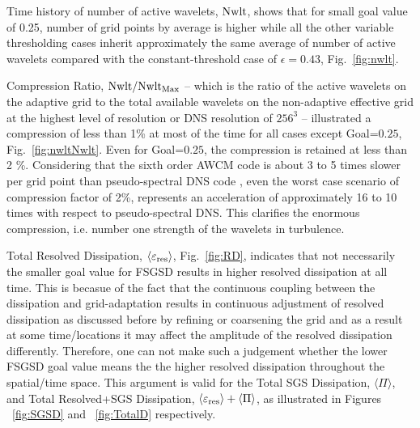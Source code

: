 Time history of number of active wavelets, ${\rm Nwlt}$, shows that for small goal value  of 0.25,
number of grid points by average is higher while all the other variable thresholding cases inherit approximately the
same average of number of active wavelets compared with the constant-threshold case of $\epsilon=0.43$, Fig.~\ref{fig:nwlt}.

Compression Ratio, ${\rm Nwlt / Nwlt_{Max}}$ --
which is the ratio of the active wavelets on the adaptive grid to
the total available wavelets on the non-adaptive effective grid at the highest level of resolution or DNS resolution of $256^3$ --
illustrated a compression of less than 1\% at most of the time for all cases except Goal=$0.25$, Fig.~\ref{fig:nwltNwlt}. Even for Goal=$0.25$, the compression is retained at less than 2 \%. Considering that the sixth order AWCM code is about 3 to 5 times slower per grid point than pseudo-spectral DNS code \cite{JFM_2010},
even the worst case scenario of compression factor of 2\%,
represents an acceleration of approximately 16 to 10 times with
respect to pseudo-spectral DNS. This clarifies the enormous compression, i.e. number one strength of the wavelets in turbulence.


Total Resolved Dissipation, $\langle \varepsilon_{\rm res} \rangle$, Fig.~\ref{fig:RD}, indicates that not necessarily the smaller goal value for FSGSD results in higher resolved dissipation at all time. This is becasue of the fact that the continuous coupling between the dissipation and grid-adaptation results in continuous adjustment of resolved dissipation as discussed before by refining or coarsening the grid and as a result at some time/locations it may affect the amplitude of the resolved dissipation differently. Therefore, one can not make such a judgement whether the lower FSGSD goal value means the the higher resolved dissipation throughout the spatial/time space. This argument is valid for the
Total SGS Dissipation,  $\langle \Pi \rangle$, and
Total Resolved+SGS Dissipation, $\langle \varepsilon_{\rm res} \rangle + \langle \Pi \rangle$,
as illustrated in Figures ~\ref{fig:SGSD} and ~\ref{fig:TotalD} respectively.

